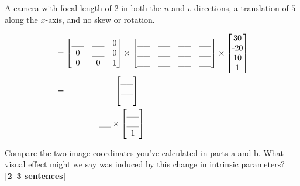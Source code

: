 \documentclass{csci1430}
\begin{document}
\pagebreak
\begin{subsubquestion}[points=1]
A camera with focal length of $2$ in both the $u$ and $v$ directions, a translation of $5$ along the $x$-axis, and no skew or rotation.
\end{subsubquestion}

\begin{answer}
\begin{align*}
    &= \begin{bmatrix} 
    \_\_ & \_\_ & $0$    \\  %
    $0$ & \_\_ & $0$     \\  %
    $0$ & $0$ & $1$ 
    \end{bmatrix} 
    \times
    \begin{bmatrix} 
    \_\_ & \_\_ & \_\_ & \_\_  \\ %
    \_\_ & \_\_ & \_\_ & \_\_  \\ %
    \_\_ & \_\_ & \_\_ & \_\_     %
    \end{bmatrix} \times
    \begin{bmatrix} 
    $30$    \\ 
    $-20$   \\ 
    $10$    \\ 
    $1$ \end{bmatrix} \\
    &= \qquad \qquad \qquad \begin{bmatrix} 
    \_\_    \\   %
    \_\_    \\   %
    \_\_         %
    \end{bmatrix} \\
    &= \qquad \quad \quad 
    \_\_         %
    \times 
    \begin{bmatrix}  
    \_\_    \\   %
    \_\_    \\   %
    $1$ 
    \end{bmatrix}
\end{align*}
\end{answer}


\begin{subquestion}[points=1]
Compare the two image coordinates you've calculated in parts a and b. What visual effect might we say was induced by this change in intrinsic parameters? \textbf{[2--3 sentences]}
\end{subquestion}
\end{document}
